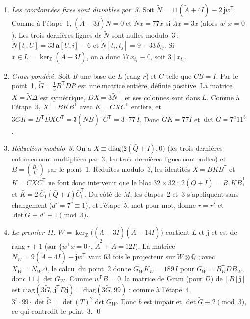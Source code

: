 \documentclass[11pt,a4paper]{article}
\theoremstyle{remark}
\newcommand{\Z}{\mathbb{Z}}
\newcommand{\Q}{\mathbb{Q}}
\newcommand{\one}{\mathbf{j}}
\begin{document}
\begin{enumerate}[leftmargin=*,nosep]
\item \emph{Les coordonnées fixes sont divisibles par~3.} Soit $\tilde N=11(\tilde A+4I)-2\,\one w^{\mathsf T}$. Comme à
l'étape~1, $(\tilde A-3I)\tilde N=0$ et $\tilde Nx=77x$ si $\tilde Ax=3x$ (alors $w^{\mathsf T}x=0$). Les trois dernières lignes
de $\tilde N$ sont nulles modulo~3 : $\tilde N[t_i,U]=33\,\mathbf a[U,i]-6$ et $\tilde N[t_i,t_j]=9+33\,\delta_{ij}$. Si
$x\in L=\ker_\Z(\tilde A-3I)$, on a donc $77\,x_{t_i}\equiv0$, soit $3\mid x_{t_i}$.
\item \emph{Gram pondéré.} Soit $B$ une base de $L$ (rang $r$) et $C$ telle que $CB=I$. Par le point~1, $\tilde G=\tfrac13
B^{\mathsf T}DB$ est une matrice entière, définie positive. La matrice $X=\tilde N\Delta$ est symétrique, $DX=3\tilde N^{\mathsf T}$,
et ses colonnes sont dans $L$. Comme à l'étape~3, $X=BKB^{\mathsf T}$ avec $K=CXC^{\mathsf T}$ entière, et
$3\tilde GK=B^{\mathsf T}DXC^{\mathsf T}=3(\tilde NB)^{\mathsf T}C^{\mathsf T}=3\cdot77\,I$. Donc $\tilde GK=77I$ et
$\det\tilde G=7^a11^b$.
\item \emph{Réduction modulo~3.} On a $X\equiv\mathrm{diag}\bigl(2(\bar Q+I),0\bigr)$ (les trois dernières colonnes sont
multipliées par~3, les trois dernières lignes sont nulles) et $\bar B=\binom{\bar B_1}{0}$ par le point~1. Réduites modulo~3, les
identités $X=BKB^{\mathsf T}$ et $K=CXC^{\mathsf T}$ ne font donc intervenir que le bloc $32\times32$ :
$2(\bar Q+I)=\bar B_1\bar K\bar B_1^{\mathsf T}$ et $\bar K=2\,\bar C_1(\bar Q+I)\bar C_1^{\mathsf T}$. Du côté de $M$, les
étapes~2 et~3 s'appliquent sans changement ($d'=7^c\equiv1$), et l'étape~5, mot pour mot, donne $r=r'$ et
$\det\tilde G\equiv d'\equiv1\pmod3$.
\item \emph{Le premier 11.} $W=\ker_\Z\bigl((\tilde A-3I)(\tilde A-14I)\bigr)$ contient $L$ et $\one$ et est de rang $r+1$ (sur
$\{w^{\mathsf T}x=0\}$, $\tilde A^2+\tilde A=12I$). La matrice $N_W=9(\tilde A+4I)-\one w^{\mathsf T}$ vaut $63$ fois le projecteur
sur $W\otimes\Q$ ; avec $X_W=N_W\Delta$, le calcul du point~2 donne $G_WK_W=189\,I$ pour $G_W=B_W^{\mathsf T}DB_W$, donc
$11\nmid\det G_W$. Comme $w^{\mathsf T}B=0$, la matrice de Gram (pour $D$) de $[B\,|\,\one]$ est
$\mathrm{diag}(3\tilde G,\,\one^{\mathsf T}D\one)=\mathrm{diag}(3\tilde G,99)$ ; comme à l'étape~4,
$3^r\cdot99\cdot\det\tilde G=\det(T)^2\det G_W$. Donc $b$ est impair et $\det\tilde G\equiv2\pmod3$, ce qui contredit le
point~3. \qed
\end{enumerate}
\end{document}
